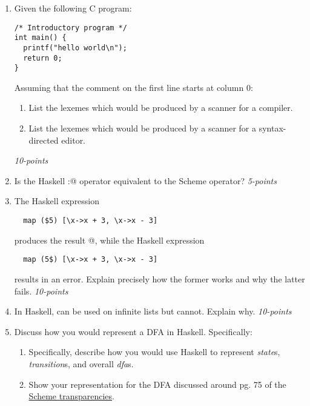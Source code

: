 \documentclass[12pt]{article}
\begin{document}
\begin{enumerate}

\item Given the following C program:

\begin{verbatim}
/* Introductory program */
int main() {
  printf("hello world\n");
  return 0;
}
\end{verbatim}

Assuming that the comment on the first line starts at column 0:

\begin{enumerate}

\item List the lexemes which would be produced by a scanner
  for a compiler.

\item List the lexemes which would be produced by a
  scanner for a syntax-directed editor. 
  
\end{enumerate}
\hfill\textit{10-points}

\item Is the Haskell \verb@:@ operator equivalent to the Scheme
  \verb@cons@ operator? \hfill\textit{5-points}

\item The Haskell expression
\begin{verbatim}
  map ($5) [\x->x + 3, \x->x - 3]
\end{verbatim}
produces the result \verb@[8,2]@, while the Haskell expression
\begin{verbatim}
  map (5$) [\x->x + 3, \x->x - 3]
\end{verbatim}
results in an error.  Explain precisely how the former works and why the
latter fails.  \hfill\textit{10-points}

\item In Haskell, \verb@foldr@ can be used on infinite lists but \verb@foldl@ cannot.  Explain why. \hfill\textit{10-points}


\item Discuss how you would represent a DFA in Haskell.  Specifically:

\begin{enumerate}  
  \item Specifically, describe how you would use
  Haskell to represent \textit{state}s,
  \textit{transition}s, and overall \textit{dfa}s.

\item Show your representation for the DFA discussed around pg. 75 of
  the \href{http://zdu.binghamton.edu/cs571-16f/slides/scheme/scheme.pdf}{Scheme transparencies}.


\end{enumerate}
\end{enumerate}
\end{document}

